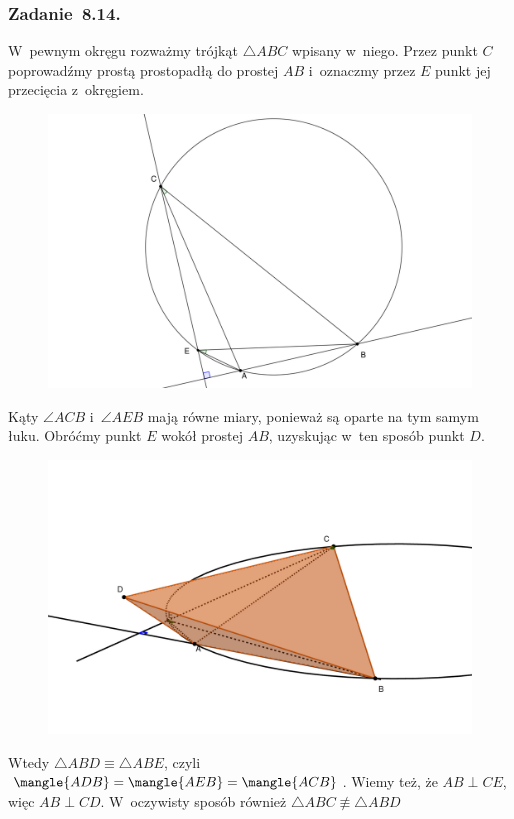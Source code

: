 \subsubsection*{Zadanie~8.14.}
W~pewnym okręgu rozważmy trójkąt \(\triangle{ABC}\) wpisany w~niego. Przez punkt \(C\) poprowadźmy prostą prostopadłą do prostej \(AB\) i~oznaczmy przez \(E\) punkt jej przecięcia z~okręgiem.
\begin{figure}[H]
    \centering
    \includegraphics[width=\textwidth]{img/2021_02_11/14/plane.png}
\end{figure}
\noindent
Kąty \(\angle{ACB}\) i~\(\angle{AEB}\) mają równe miary, ponieważ są oparte na tym samym łuku. Obróćmy punkt \(E\) wokół prostej \(AB\), uzyskując w~ten sposób punkt \(D\).
\begin{figure}[H]
    \centering
    \includegraphics[scale=0.28]{img/2021_02_11/14/space.png}
\end{figure}
\noindent
Wtedy \(\triangle{ABD} \equiv \triangle{ABE}\), czyli \(\mangle{ADB} = \mangle{AEB} = \mangle{ACB}\). Wiemy też, że \(AB \perp CE\), więc \(AB \perp CD\). W~oczywisty sposób również \(\triangle{ABC} \not\equiv \triangle{ABD}\)
